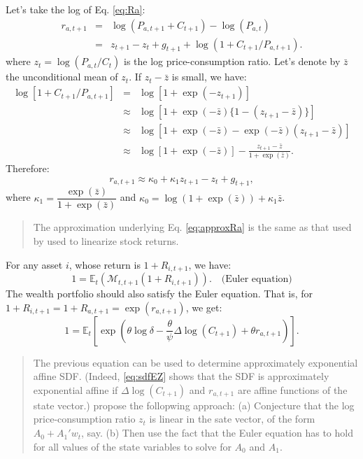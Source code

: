 \documentclass[
  12pt,
]{book}
\theoremstyle{definition}
\theoremstyle{definition}
\theoremstyle{definition}
\theoremstyle{definition}
\theoremstyle{remark}
\begin{document}
Let's take the log of Eq. \eqref{eq:Ra}:
\begin{eqnarray*}
r_{a,t+1} &=& \log(P_{a,t+1}+C_{t+1}) - \log(P_{a,t})\\
&=& z_{t+1} - z_t + g_{t+1} + \log(1 + C_{t+1} / P_{a,t+1}).
\end{eqnarray*}
where \(z_t = \log(P_{a,t}/C_t)\) is the log price-consumption ratio.
Let's denote by \(\bar{z}\) the unconditional mean of \(z_t\). If \(z_t - \bar{z}\) is small, we have:
\begin{eqnarray*}
\log[1 + C_{t+1} / P_{a,t+1}] &=& \log[1 + \exp(-z_{t+1})]\\
&\approx& \log[1 + \exp(-\bar{z})\{1 - (z_{t+1}- \bar{z})\}]\\
&\approx& \log[1 + \exp(-\bar{z}) - \exp(-\bar{z})(z_{t+1}- \bar{z})]\\
&\approx& \log[1 + \exp(-\bar{z})] - \frac{z_{t+1}- \bar{z}}{1 + \exp(\bar{z})}.
\end{eqnarray*}
Therefore:
\begin{equation}
\boxed{r_{a,t+1} \approx \kappa_0 + \kappa_1 z_{t+1} - z_t + g_{t+1},}\label{eq:approxRa}
\end{equation}
where \(\kappa_1= \dfrac{\exp(\bar{z})}{1 + \exp(\bar{z})}\) and \(\kappa_0 = \log(1 + \exp(\bar{z})) + \kappa_1 \bar{z}\).

\begin{quote}
The approximation underlying Eq. \eqref{eq:approxRa} is the same as that used by \citet{Campbell_Shiller_1988} used to linearize stock returns.
\end{quote}

For any asset \(i\), whose return is \(1+R_{i,t+1}\), we have:
\begin{equation}
1 = \mathbb{E}_t(\mathcal{M}_{t,t+1}(1+R_{i,t+1})). \quad \mbox{(Euler equation)}\label{eq:Euler}
\end{equation}
The wealth portfolio should also satisfy the Euler equation. That is, for \(1+R_{i,t+1} = 1+R_{a,t+1} = \exp(r_{a,t+1})\), we get:
\begin{equation}
1 = \mathbb{E}_t \left[ \exp\left(\theta \log \delta - \frac{\theta}{\psi} \Delta \log(C_{t+1}) + \theta r_{a,t+1} \right) \right].\label{eq:sdfRa}
\end{equation}

\begin{quote}
The previous equation can be used to determine approximately exponential affine SDF. (Indeed, \eqref{eq:sdfEZ} shows that the SDF is approximately exponential affine if \(\Delta \log(C_{t+1})\) and \(r_{a,t+1}\) are affine functions of the state vector.) \citet{Bansal_Yaron_2004} propose the follopwing approach: (a) Conjecture that the log price-consumption ratio \(z_t\) is linear in the sate vector, of the form \(A_0 + A_1'w_t\), say. (b) Then use the fact that the Euler equation has to hold for all values of the state variables to solve for \(A_0\) and \(A_1\).
\end{quote}
\end{document}
